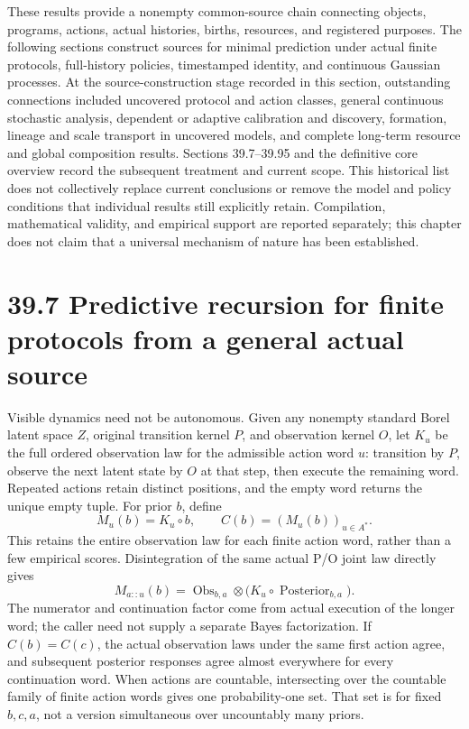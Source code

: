 \documentclass[
  english,
  11pt,
  oneside]{book}
\newcounter{none} %
\begin{document}
These results provide a nonempty common-source chain connecting objects, programs, actions, actual histories, births, resources, and registered purposes. The following sections construct sources for minimal prediction under actual finite protocols, full-history policies, timestamped identity, and continuous Gaussian processes. At the source-construction stage recorded in this section, outstanding connections included uncovered protocol and action classes, general continuous stochastic analysis, dependent or adaptive calibration and discovery, formation, lineage and scale transport in uncovered models, and complete long-term resource and global composition results. Sections 39.7--39.95 and the definitive core overview record the subsequent treatment and current scope. This historical list does not collectively replace current conclusions or remove the model and policy conditions that individual results still explicitly retain. Compilation, mathematical validity, and empirical support are reported separately; this chapter does not claim that a universal mechanism of nature has been established.

\section{39.7 Predictive recursion for finite protocols from a general actual source}\label{predictive-recursion-for-finite-protocols-from-a-general-actual-source}

Visible dynamics need not be autonomous. Given any nonempty standard Borel latent space \(Z\), original transition kernel \(P\), and observation kernel \(O\), let \(K_u\) be the full ordered observation law for the admissible action word \(u\): transition by \(P\), observe the next latent state by \(O\) at that step, then execute the remaining word. Repeated actions retain distinct positions, and the empty word returns the unique empty tuple. For prior \(b\), define \[M_u(b)=K_u\circ b,\qquad C(b)=(M_u(b))_{u\in A^*}.\] This retains the entire observation law for each finite action word, rather than a few empirical scores. Disintegration of the same actual P/O joint law directly gives \[M_{a::u}(b)=\operatorname{Obs}_{b,a}\otimes
  \bigl(K_u\circ\operatorname{Posterior}_{b,a}\bigr).\] The numerator and continuation factor come from actual execution of the longer word; the caller need not supply a separate Bayes factorization. If \(C(b)=C(c)\), the actual observation laws under the same first action agree, and subsequent posterior responses agree almost everywhere for every continuation word. When actions are countable, intersecting over the countable family of finite action words gives one probability-one set. That set is for fixed \(b,c,a\), not a version simultaneous over uncountably many priors.
\end{document}
